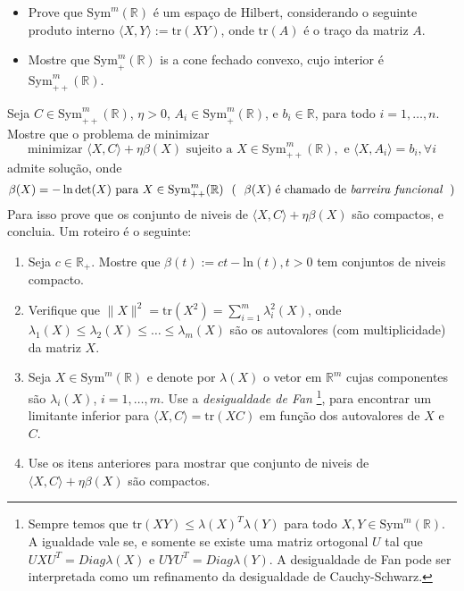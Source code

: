 \documentclass[a4paper,latin]{article}
\begin{document}
\begin{enumerate}
    \begin{itemize}
    \item Prove que 
    $\text{Sym}^{m}(\mathbb{R})$
    é um espaço de Hilbert, 
    considerando o seguinte 
    produto interno 
    $\langle X, Y \rangle:=\text{tr}(XY)$, 
    onde $\text{tr}(A)$ é 
    o traço da matriz $A$. 
    \item Mostre que $\text{Sym}^{m}_{+}(\mathbb{R})$ is a cone fechado convexo, 
    cujo interior é $\text{Sym}^{m}_{++}(\mathbb{R})$.
    \end{itemize}
    Seja $C \in \text{Sym}_{++}^{m}(\mathbb{R})$, $\eta>0$, $A_{i} \in \text{Sym}^{m}_{+}(\mathbb{R})$, e
     $b_{i} \in \mathbb{R}$, para todo $i=1,\dots, n$.
    Mostre que o problema de minimizar 
    $$\text{minimizar } \langle X, C\rangle+\eta \beta(X) \text{ sujeito a } 
    X \in \text{Sym}_{++}^{m}(\mathbb{R}), \text{ e } 
    \langle X, A_{i} \rangle=b_i, \forall i $$
    admite solução, onde 
    $$ \beta(X)=-\ln \det(X) \text{ para  } X \in \text{Sym}_{++}^{m}(\mathbb{R}) \  \ (\ \ 
    \beta(X) \text{ é chamado de {\it  barreira funcional}} \ \ )$$ 
    Para isso
     prove que os conjunto de niveis de 
     $\langle X, C\rangle+\eta\beta(X)$ são compactos, e concluia.
     Um roteiro é o seguinte:
       \begin{enumerate}
       \item Seja $c\in \mathbb{R}_{+}$. Mostre que $\beta(t):=ct-\text{ln}(t), t>0$ tem conjuntos de niveis compacto.
       \item Verifique que $\|X\|^{2}=\text{tr}(X^2)=\sum_{i=1}^{m} \lambda^2_{i}(X)$, 
       onde $\lambda_{1}(X)\leq \lambda_{2}(X)\leq \dots \leq \lambda_{m}(X)$ são os autovalores (com multiplicidade) da matriz $X$.
       \item Seja $X \in \text{Sym}^{m}(\mathbb{R})$ e denote por $\lambda(X)$ o vetor em $\mathbb{R}^{m}$
       cujas componentes são $\lambda_{i}(X)$, $i=1, \dots, m$.
       Use a {\it desigualdade de Fan} 
       \footnote{Sempre temos que 
       $\text{tr}(XY)
       \leq \lambda(X)^{T}\lambda(Y)$ 
       para todo 
    $X,Y \in \text{Sym}^{m}(\mathbb{R})$.
       A igualdade vale se, e somente se 
       existe uma matriz ortogonal $U$ 
       tal que
       $UXU^{T}=Diag \lambda(X)$ 
       e
       $UYU^{T}=Diag \lambda(Y)$.
       A desigualdade de Fan pode ser interpretada como um refinamento da  desigualdade de Cauchy-Schwarz.}, 
       para encontrar um limitante inferior para $\langle X, C\rangle=\text{tr}(XC)$ em função dos autovalores de $X$ e $C$.
       \item Use os itens anteriores para mostrar que 
        conjunto de niveis de 
     $\langle X, C\rangle+\eta\beta(X)$ são compactos.
       \end{enumerate}
 

\end{enumerate}
\end{document}
